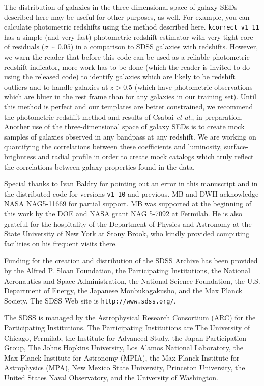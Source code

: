 \documentclass[10pt,preprint]{aastex}
\newcommand{\kversion}{{\tt v1\_11}}
\begin{document}
The distribution of galaxies in the three-dimensional space of galaxy
SEDs described here may be useful for other purposes, as well. For
example, you can calculate photometric redshifts using the method
described here. {\tt kcorrect \kversion} has a simple (and very fast)
photometric redshift estimator with very tight core of residuals
($\sigma \sim 0.05$) in a comparison to SDSS galaxies with redshifts.
However, we warn the reader that before this code can be used as a
reliable photometric redshift indicator, more work has to be done
(which the reader is invited to do using the released code) to
identify galaxies which are likely to be redshift outliers and to
handle galaxies at $z>0.5$ (which have photometric observations which
are bluer in the rest frame than for any galaxies in our training
set). Until this method is perfect and our templates are better
constrained, we recommend the photometric redshift method and results
of Csabai {\it et al.}, in preparation. Another use of the
three-dimensional space of galaxy SEDs is to create mock samples of
galaxies observed in any bandpass at any redshift. We are working on
quantifying the correlations between these coefficients and
luminosity, surface-brighntess and radial profile in order to create
mock catalogs which truly reflect the correlations between galaxy
properties found in the data.

\acknowledgments

Special thanks to Ivan Baldry for pointing out an error in this
manuscript and in the distributed code for versions {\tt v1\_10} and
previous.  MB and DWH acknowledge NASA NAG5-11669 for partial support.
MB was supported at the beginning of this work by the DOE and NASA
grant NAG 5-7092 at Fermilab. He is also grateful for the hospitality
of the Department of Physics and Astronomy at the State University of
New York at Stony Brook, who kindly provided computing facilities on
his frequent visits there.

Funding for the creation and distribution of the SDSS Archive has been
provided by the Alfred P. Sloan Foundation, the Participating
Institutions, the National Aeronautics and Space Administration, the
National Science Foundation, the U.S. Department of Energy, the
Japanese Monbukagakusho, and the Max Planck Society. The SDSS Web site
is {\tt http://www.sdss.org/}.

The SDSS is managed by the Astrophysical Research Consortium (ARC) for
the Participating Institutions. The Participating Institutions are The
University of Chicago, Fermilab, the Institute for Advanced Study, the
Japan Participation Group, The Johns Hopkins University, Los Alamos
National Laboratory, the Max-Planck-Institute for Astronomy (MPIA),
the Max-Planck-Institute for Astrophysics (MPA), New Mexico State
University, Princeton University, the United States Naval Observatory,
and the University of Washington.
 
\begin{thebibliography}{DUM}

\end{thebibliography}

\newpage

%


\end{document}

